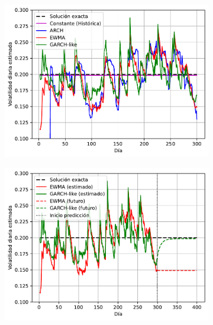 \begin{figure}[H]
    \centering
    \begin{subfigure}[b]{0.45\linewidth}
        \includegraphics[width=\linewidth]{Imagenes/Parte1/7_Volatilidad/Volatilidad.pdf}
    \end{subfigure}
    \begin{subfigure}[b]{0.5\linewidth}
        \includegraphics[width=\linewidth]{Imagenes/Parte1/7_Volatilidad/Volatilidad_Prediccion.pdf}
    \end{subfigure}
    \begin{subfigure}[b]{0.45\linewidth}

\end{subfigure}
\end{figure}
